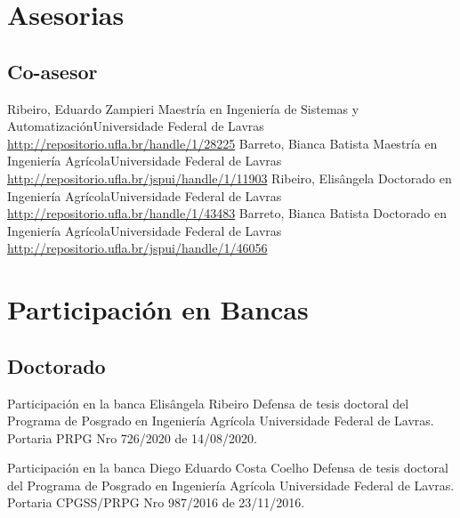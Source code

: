 \documentclass[11pt,a4paper,sans]{moderncv} %
\begin{document}
	       
\section{Asesorias}
\subsection{Co-asesor}
			{Ribeiro, Eduardo Zampieri}
			{Maestría en Ingeniería de Sistemas y Automatización}{Universidade Federal de Lavras}
			{\url{http://repositorio.ufla.br/handle/1/28225}}
			{Barreto, Bianca Batista}
			{Maestría en Ingeniería Agrícola}{Universidade Federal de Lavras}
			{\url{http://repositorio.ufla.br/jspui/handle/1/11903}}
			{Ribeiro, Elisângela }
			{Doctorado en Ingeniería Agrícola}{Universidade Federal de Lavras}
			{\url{http://repositorio.ufla.br/handle/1/43483}}
			{Barreto, Bianca Batista}
			{Doctorado en Ingeniería Agrícola}{Universidade Federal de Lavras}
			{\url{http://repositorio.ufla.br/jspui/handle/1/46056}}
			
\section{Participación en Bancas}
\subsection{Doctorado}

			{Participación en la banca Elisângela Ribeiro}
			{Defensa de tesis doctoral del Programa de Posgrado en Ingeniería Agrícola}{}
			{Universidade Federal de Lavras. Portaria PRPG Nro 726/2020 de 14/08/2020.}


			{Participación en la banca Diego Eduardo Costa Coelho}
			{Defensa de tesis doctoral del Programa de Posgrado en Ingeniería Agrícola}{}
			{Universidade Federal de Lavras. Portaria CPGSS/PRPG Nro 987/2016 de 23/11/2016.}
\end{document}
